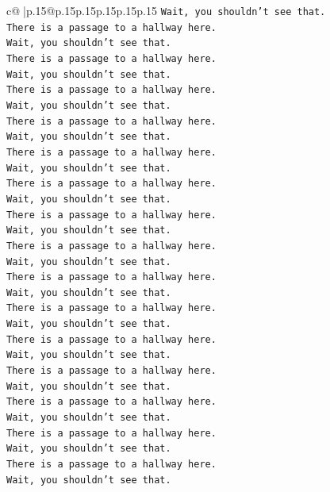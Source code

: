 \documentclass{article}
\begin{document}
{\begin{supertabular}{c@{$\;$}|p{.15\linewidth}@{}p{.15\linewidth}p{.15\linewidth}p{.15\linewidth}p{.15\linewidth}p{.15\linewidth}}
{{{\texttt{Wait, you shouldn't see that.} \\
\texttt{There is a passage to a hallway here.} \\
\texttt{Wait, you shouldn't see that.} \\
\texttt{There is a passage to a hallway here.} \\
\texttt{Wait, you shouldn't see that.} \\
\texttt{There is a passage to a hallway here.} \\
\texttt{Wait, you shouldn't see that.} \\
\texttt{There is a passage to a hallway here.} \\
\texttt{Wait, you shouldn't see that.} \\
\texttt{There is a passage to a hallway here.} \\
\texttt{Wait, you shouldn't see that.} \\
\texttt{There is a passage to a hallway here.} \\
\texttt{Wait, you shouldn't see that.} \\
\texttt{There is a passage to a hallway here.} \\
\texttt{Wait, you shouldn't see that.} \\
\texttt{There is a passage to a hallway here.} \\
\texttt{Wait, you shouldn't see that.} \\
\texttt{There is a passage to a hallway here.} \\
\texttt{Wait, you shouldn't see that.} \\
\texttt{There is a passage to a hallway here.} \\
\texttt{Wait, you shouldn't see that.} \\
\texttt{There is a passage to a hallway here.} \\
\texttt{Wait, you shouldn't see that.} \\
\texttt{There is a passage to a hallway here.} \\
\texttt{Wait, you shouldn't see that.} \\
\texttt{There is a passage to a hallway here.} \\
\texttt{Wait, you shouldn't see that.} \\
\texttt{There is a passage to a hallway here.} \\
\texttt{Wait, you shouldn't see that.} \\
\texttt{There is a passage to a hallway here.} \\
\texttt{Wait, you shouldn't see that.} \\
}}}
\end{supertabular}}
\end{document}
